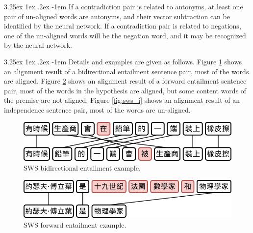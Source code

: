 \documentclass[12pt]{article}
\makeatletter
\renewcommand\paragraph{\@startsection{paragraph}{5}{\z@}%
  {3.25ex \@plus1ex \@minus.2ex}%
  {-1em}%
  {\normalfont\normalsize\bfseries}}
\makeatother
\begin{document}
\begin{CJK*}{UTF8}{bkai}
\begin{spacing}{1.77}
\paragraph{}
If a contradiction pair is related to antonyms, at least one pair of un-aligned words are antonyms, and their vector subtraction can be identified by the neural network. If a contradiction pair is related to negations, one of the un-aligned words will be the negation word, and it may be recognized by the neural network.

\paragraph{}
Details and examples are given as follows. Figure \ref{fig:sws_b} shows an alignment result of a bidirectional entailment sentence pair, most of the words are aligned. Figure \ref{fig:sws_f} shows an alignment result of a forward entailment sentence pair, most of the words in the hypothesis are aligned, but some content words of the premise are not aligned. Figure \ref{fig:sws_i} shows an alignment result of an independence sentence pair, most of the words are un-aligned.

\hspace*{-1.5in}
\begin{figure}[H]
  \centering
  \includegraphics[scale=0.6]{SWS.B.png}
  \caption[SWS Bidirectional Entailment Example]{SWS bidirectional entailment example.}
  \label{fig:sws_b}
\end{figure}

\hspace*{-1.5in}
\begin{figure}[H]
  \centering
  \includegraphics[scale=0.6]{SWS.F.png}
  \caption[SWS Forward Entailment Example]{SWS forward entailment example.}
  \label{fig:sws_f}
\end{figure}


\end{spacing}
\end{CJK*}
\end{document}
